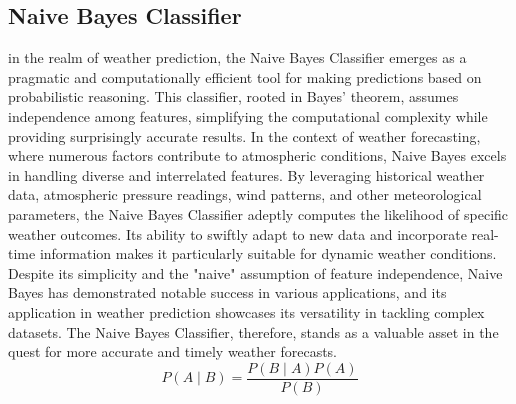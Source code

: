 \documentclass[conference, onecolumn]{IEEEtran}
\begin{document}
\subsection{\textbf{Naive Bayes Classifier}}
in the realm of weather prediction, the Naive Bayes Classifier emerges as a pragmatic and computationally efficient tool for making predictions based on probabilistic reasoning. This classifier, rooted in Bayes' theorem, assumes independence among features, simplifying the computational complexity while providing surprisingly accurate results. In the context of weather forecasting, where numerous factors contribute to atmospheric conditions, Naive Bayes excels in handling diverse and interrelated features. By leveraging historical weather data, atmospheric pressure readings, wind patterns, and other meteorological parameters, the Naive Bayes Classifier adeptly computes the likelihood of specific weather outcomes. Its ability to swiftly adapt to new data and incorporate real-time information makes it particularly suitable for dynamic weather conditions. Despite its simplicity and the "naive" assumption of feature independence, Naive Bayes has demonstrated notable success in various applications, and its application in weather prediction showcases its versatility in tackling complex datasets. The Naive Bayes Classifier, therefore, stands as a valuable asset in the quest for more accurate and timely weather forecasts.
\\ \[ P(A \mid B) = \frac{P(B \mid A) P(A)}{P(B)} \]
\end{document}
